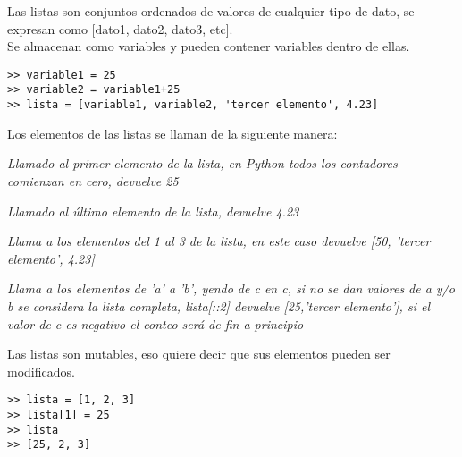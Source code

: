 \documentclass[10pt,a4paper]{article}
\begin{document}
\begin{description}[
align=right,
labelindent = 1cm,
labelsep=0.5cm,
itemindent=0cm]

    \item [list] 
        Las listas son conjuntos ordenados de valores de cualquier tipo de dato, se expresan como [dato1, dato2, dato3, etc].\\
        Se almacenan como variables y pueden contener variables dentro de ellas.
    
\begin{lstlisting}
>> variable1 = 25
>> variable2 = variable1+25
>> lista = [variable1, variable2, 'tercer elemento', 4.23]\end{lstlisting} 
Los elementos de las listas se llaman de la siguiente manera:
            
	\begin{description}[leftmargin=!,labelwidth=2.5cm,itemindent=0cm]
            \item [{$>>$ lista[0]}] \textit{Llamado al primer elemento de la lista, en Python todos los contadores comienzan en cero, devuelve 25}
            \item [{$>>$ lista[-1]}] \textit{Llamado al último elemento de la lista, devuelve 4.23}
            \item [{$>>$ lista[1:3]}] \textit{Llama a los elementos del 1 al 3 de la lista, en este caso devuelve \emph{[50, 'tercer elemento', 4.23]}}
            \item [{$>>$ lista[a:b:c]}] \textit{Llama a los elementos de 'a' a 'b', yendo de c en c, si no se dan valores de a y/o b se considera la lista completa, \emph{lista[::2]} devuelve \emph{[25,'tercer elemento']}, si el valor de c es negativo el conteo será de fin a principio}
	\end{description}
   
Las listas son mutables, eso quiere decir que sus elementos pueden ser modificados.\\
\begin{lstlisting}
>> lista = [1, 2, 3]
>> lista[1] = 25
>> lista
>> [25, 2, 3]\end{lstlisting}


\end{description}
\end{document}
